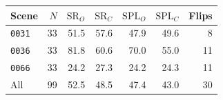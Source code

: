 \begin{tabular*}{\columnwidth}{@{\extracolsep{\fill}}lrrrrrr@{}}
\toprule
Scene & $N$ & $\mathrm{SR}_O$ & $\mathrm{SR}_C$ & $\mathrm{SPL}_O$ & $\mathrm{SPL}_C$ & Flips \\
\midrule
\texttt{0031} & 33 & 51.5 & 57.6 & 47.9 & 49.6 & 8 \\
\texttt{0036} & 33 & 81.8 & 60.6 & 70.0 & 55.0 & 11 \\
\texttt{0066} & 33 & 24.2 & 27.3 & 24.2 & 24.3 & 11 \\
\midrule
All & 99 & 52.5 & 48.5 & 47.4 & 43.0 & 30 \\
\bottomrule
\end{tabular*}
